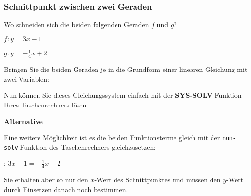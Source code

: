 \subsubsection{Schnittpunkt zwischen zwei Geraden}

Wo schneiden sich die beiden folgenden Geraden $f$ und $g$?

$f: y=3x - 1$

$g: y=-\frac14x +2$

Bringen Sie die beiden Geraden je in die Grundform einer linearen
Gleichung mit zwei Variablen:


Nun können Sie dieses Gleichungssystem einfach mit
der \textbf{SYS-SOLV}-Funktion Ihres Taschenrechners lösen.

\vspace{5mm}


\vspace{5mm}

\textbf{Alternative}

Eine weitere Möglichkeit ist es die beiden Funktionsterme gleich mit
der \texttt{num-solv}-Funktion des Taschenrechners gleichzusetzen:

: $3x-1 = -\frac14x+2$

Sie erhalten aber so nur den $x$-Wert des Schnittpunktes und müssen
den $y$-Wert durch Einsetzen danach noch bestimmen.


